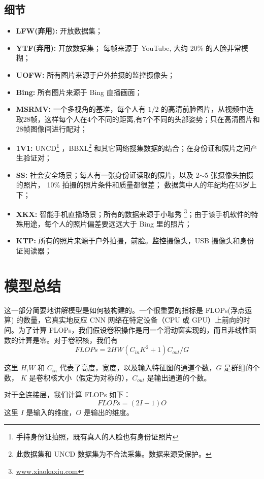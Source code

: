 \documentclass[a4paper, 11pt, UTF8]{ctexart}%
\begin{document}
\subsection{细节}
\begin{itemize}
  \item \textbf{LFW(弃用):} 开放数据集；
  \item \textbf{YTF(弃用):} 开放数据集； 每帧来源于 YouTube, 大约 20\% 的人脸非常模糊；
  \item \textbf{UOFW:} 所有图片来源于户外拍摄的监控摄像头；
  \item \textbf{Bing:} 所有图片来源于 Bing 直播画面；
  \item \textbf{MSRMV:} 一个多视角的基准，每个人有 $1/2$ 的高清前脸图片，从视频中选取28帧，这样每个人在4个不同的距离,有7个不同的头部姿势；只在高清图片和28帧图像间进行配对；
  \item \textbf{1V1:} UNCD\footnote{手持身份证拍照，既有真人的人脸也有身份证照片} ，BBXL\footnote{此数据集和 UNCD 数据集为不合法采集。数据来源受保护。} 和其它网络搜集数据的结合；在身份证和照片之间产生验证对；
  \item \textbf{SS:} 社会安全场景；每人有一张身份证读取的照片，以及 2$\sim$5 张摄像头拍摄的照片， 10\% 拍摄的照片条件和质量都很差； 数据集中人的年纪均在55岁上下；
  \item \textbf{XKX:} 智能手机直播场景；所有的数据来源于小咖秀 \footnote{\url{www.xiaokaxiu.com}}；由于该手机软件的特殊用途，每个人的照片偏差要远远大于 Bing 里的照片；
  \item \textbf{KTP:} 所有的照片来源于户外拍摄，前脸。监控摄像头，USB 摄像头和身份证阅读器；
\end{itemize}

\section{模型总结}
这一部分简要地讲解模型是如何被构建的。一个很重要的指标是 FLOPs(浮点运算) 的数量，它真实地反应 CNN 网络在特定设备（CPU 或 GPU）上前向的时间。为了计算 FLOPs，我们假设卷积操作是用一个滑动窗实现的，而且非线性函数的计算是零。对于卷积核，我们有
\begin{equation}\label{Flops_conv}
  FLOPs = 2HW(C_{in}K^2+1)C_{out}/G
\end{equation}

这里 $H$,$W$ 和 $C_{in}$ 代表了高度，宽度，以及输入特征图的通道个数，$G$ 是群组的个数， $K$ 是卷积核大小（假定为对称的），$C_{out}$ 是输出通道的个数。

对于全连接层，我们计算 FLOPs 如下：
\begin{equation}\label{Flops_ip}
  FLOPs = (2I -1)O
\end{equation}
这里 $I$ 是输入的维度，$O$ 是输出的维度。
\end{document}
